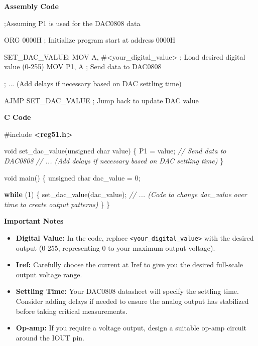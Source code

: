 \documentclass[
]{article}
\newenvironment{Shaded}{}{}
\newcommand{\CommentTok}[1]{\textcolor[rgb]{0.38,0.63,0.69}{\textit{#1}}}
\newcommand{\ControlFlowTok}[1]{\textcolor[rgb]{0.00,0.44,0.13}{\textbf{#1}}}
\newcommand{\DataTypeTok}[1]{\textcolor[rgb]{0.56,0.13,0.00}{#1}}
\newcommand{\DecValTok}[1]{\textcolor[rgb]{0.25,0.63,0.44}{#1}}
\newcommand{\ImportTok}[1]{\textcolor[rgb]{0.00,0.50,0.00}{\textbf{#1}}}
\newcommand{\NormalTok}[1]{#1}
\newcommand{\OperatorTok}[1]{\textcolor[rgb]{0.40,0.40,0.40}{#1}}
\newcommand{\PreprocessorTok}[1]{\textcolor[rgb]{0.74,0.48,0.00}{#1}}
\begin{document}
\textbf{Assembly Code}

\begin{Shaded}
\begin{Highlighting}[]
\NormalTok{;Assuming P1 is used for the DAC0808 data}

\NormalTok{ORG 0000H ; Initialize program start at address 0000H}

\NormalTok{SET\_DAC\_VALUE:}
\NormalTok{    MOV A, \#\textless{}your\_digital\_value\textgreater{}  ; Load desired digital value (0{-}255)}
\NormalTok{    MOV P1, A                     ; Send data to DAC0808}

\NormalTok{    ; ... (Add delays if necessary based on DAC settling time)}

\NormalTok{    AJMP SET\_DAC\_VALUE            ; Jump back to update DAC value}
\end{Highlighting}
\end{Shaded}

\textbf{C Code}

\begin{Shaded}
\begin{Highlighting}[]
\PreprocessorTok{\#include }\ImportTok{\textless{}reg51.h\textgreater{}}

\DataTypeTok{void}\NormalTok{ set\_dac\_value}\OperatorTok{(}\DataTypeTok{unsigned} \DataTypeTok{char}\NormalTok{ value}\OperatorTok{)} \OperatorTok{\{}
\NormalTok{    P1 }\OperatorTok{=}\NormalTok{ value}\OperatorTok{;}  \CommentTok{// Send data to DAC0808}
    \CommentTok{// ... (Add delays if necessary based on DAC settling time)}
\OperatorTok{\}}

\DataTypeTok{void}\NormalTok{ main}\OperatorTok{()} \OperatorTok{\{}
    \DataTypeTok{unsigned} \DataTypeTok{char}\NormalTok{ dac\_value }\OperatorTok{=} \DecValTok{0}\OperatorTok{;}

    \ControlFlowTok{while} \OperatorTok{(}\DecValTok{1}\OperatorTok{)} \OperatorTok{\{}
\NormalTok{        set\_dac\_value}\OperatorTok{(}\NormalTok{dac\_value}\OperatorTok{);}
        \CommentTok{// ... (Code to change dac\_value over time to create output patterns)}
    \OperatorTok{\}}
\OperatorTok{\}}
\end{Highlighting}
\end{Shaded}

\textbf{Important Notes}

\begin{itemize}
\item
  \textbf{Digital Value:} In the code, replace
  \texttt{\textless{}your\_digital\_value\textgreater{}} with the
  desired output (0-255, representing 0 to your maximum output voltage).
\item
  \textbf{Iref:} Carefully choose the current at Iref to give you the
  desired full-scale output voltage range.
\item
  \textbf{Settling Time:} Your DAC0808 datasheet will specify the
  settling time. Consider adding delays if needed to ensure the analog
  output has stabilized before taking critical measurements.
\item
  \textbf{Op-amp:} If you require a voltage output, design a suitable
  op-amp circuit around the IOUT pin.
\end{itemize}
\end{document}
